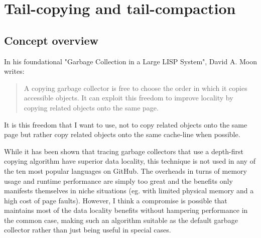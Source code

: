 \documentclass[a4paper,oneside]{memoir}
\begin{document}
\chapter{Tail-copying and tail-compaction}

\section{Concept overview}
\label{concept_overview}

In his foundational "Garbage Collection in a Large LISP System", David A. Moon writes:
\blockquote{A copying garbage collector is free to choose the order in which
it copies accessible objects. It can exploit this freedom to improve locality by
copying related objects onto the same page.}
\cite{Moon:1984}
It is this freedom that I want to use, not to copy related objects onto the same
page but rather copy related objects onto the same cache-line when possible.

While it has been shown that tracing garbage collectors that use a depth-first
copying algorithm have superior data locality, this technique is not used in any
of the ten most popular languages on GitHub. The overheads in turns of memory
usage and runtime performance are simply too great and the benefits only
manifests themselves in niche situations (eg. with limited physical memory and
a high cost of page faults). However, I think a compromise is possible that
maintains most of the data locality benefits without hampering performance in
the common case, making such an algorithm suitable as the default garbage
collector rather than just being useful in special cases.
\end{document}
